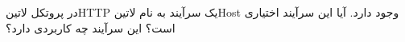 
در پروتکل ‌لاتین{HTTP} یک سرآیند به نام ‌لاتین{Host} وجود دارد. آیا این سرآیند اختیاری است؟ این سرآیند چه کاربردی دارد؟

